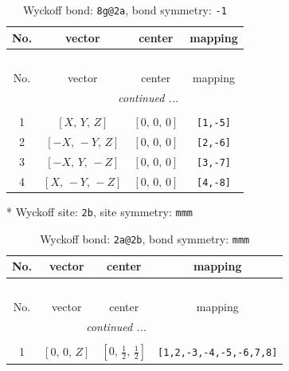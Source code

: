 \documentclass[fleqn,8pt]{jsarticle}
\begin{document}
\begin{longtable}{cccc}
\caption{Wyckoff bond: {\tt 8g@2a}, bond symmetry: {\tt -1}}
 \\
 \hline \hline
No. & vector & center & mapping \\ \hline \endfirsthead

\multicolumn{3}{l}{\tablename\ \thetable{}} \\
 \hline \hline
No. & vector & center & mapping \\ \hline \endhead

 \hline \hline
\multicolumn{3}{r}{\footnotesize\it continued ...} \\ \endfoot

 \hline \hline
\multicolumn{3}{r}{} \\ \endlastfoot

1 & $\left[ X,\, Y,\, Z \right]$ & $\left[ 0,\, 0,\, 0 \right]$ & {\tt [1,-5]} \\ \hline
2 & $\left[ - X,\, - Y,\, Z \right]$ & $\left[ 0,\, 0,\, 0 \right]$ & {\tt [2,-6]} \\ \hline
3 & $\left[ - X,\, Y,\, - Z \right]$ & $\left[ 0,\, 0,\, 0 \right]$ & {\tt [3,-7]} \\ \hline
4 & $\left[ X,\, - Y,\, - Z \right]$ & $\left[ 0,\, 0,\, 0 \right]$ & {\tt [4,-8]} \\
\end{longtable}
* Wyckoff site: {\tt 2b}, site symmetry: {\tt mmm}
\renewcommand{\arraystretch}{1.2}
\begin{longtable}{cccc}
\caption{Wyckoff bond: {\tt 2a@2b}, bond symmetry: {\tt mmm}}
 \\
 \hline \hline
No. & vector & center & mapping \\ \hline \endfirsthead

\multicolumn{3}{l}{\tablename\ \thetable{}} \\
 \hline \hline
No. & vector & center & mapping \\ \hline \endhead

 \hline \hline
\multicolumn{3}{r}{\footnotesize\it continued ...} \\ \endfoot

 \hline \hline
\multicolumn{3}{r}{} \\ \endlastfoot

1 & $\left[ 0,\, 0,\, Z \right]$ & $\left[ 0,\, \frac{1}{2},\, \frac{1}{2} \right]$ & {\tt [1,2,-3,-4,-5,-6,7,8]} \\
\end{longtable}
\renewcommand{\arraystretch}{1.2}
\end{document}
